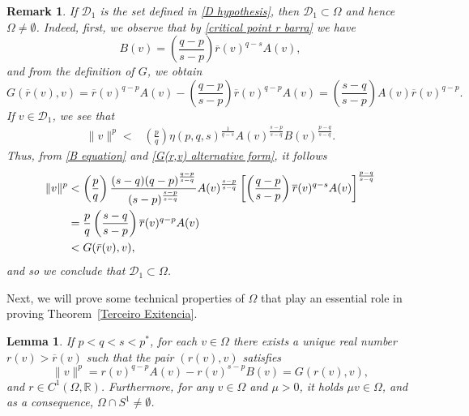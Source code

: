 \documentclass[12pt,reqno]{amsart}
\newtheorem{lemma}[theorem]{Lemma}
\newtheorem{remark}[theorem]{Remark}
\begin{document}
\begin{remark}\label{OmegaNaoVaZIO}
If $\mathcal{D}_1$ is the set defined in \eqref{D hypothesis}, then $\mathcal{D}_1\subset \Omega$ and hence $\Omega\neq\emptyset$. Indeed, first, we observe that by \eqref{critical point r barra} we have
	\begin{equation}\label{B equation}
		B(v)=\left(\frac{q-p}{s-p}\right)\overline{r}(v)^{q-s}A(v),
	\end{equation}
	and  from the definition of $G$, we obtain
	\begin{equation}\label{G(r,v) alternative form}
		G(\overline{r}(v),v)=\overline{r}(v)^{q-p}A(v)-\left(\frac{q-p}{s-p}\right)\overline{r}(v)^{q-p}A(v)= \left(\frac{s-q}{s-p}\right) A(v)\overline{r}(v)^{q-p}.
	\end{equation}	
	If $v \in \mathcal{D}_1$, we see that 
	\begin{align*}
		\|v\|^p<&\left(\frac{p}{q}\right)\eta(p,q,s)^{\frac{1}{q-s}}A(v)^{\frac{s-p}{s-q}}B(v)^{\frac{p-q}{s-q}}.
	\end{align*}
	Thus, from \eqref{B equation} and \eqref{G(r,v) alternative form}, it follows 
	\begin{align*}
		\|v\|^p&<\left(\frac{p}{q}\right)\frac{(s-q)(q-p)^{\frac{q-p}{s-q}}}{(s-p)^{\frac{s-p}{s-q}}}A(v)^{\frac{s-p}{s-q}}\left[\left(\frac{q-p}{s-p}\right)\overline{r}(v)^{q-s}A(v)\right]^{\frac{p-q}{s-q}}\\
		&=\frac{p}{q}\left(\frac{s-q}{s-p}\right)\overline{r}(v)^{q-p}A(v)\\
  &<G(\Bar{r}(v),v),
	\end{align*}
and so we conclude that $\mathcal{D}_1\subset \Omega$. 
\end{remark}



Next, we will prove some technical properties of $\Omega$ that play an essential role in proving Theorem~\ref{Terceiro Exitencia}.


\begin{lemma}\label{Propriedades Omega} If $p<q<s<p^*$, for each $v \in \Omega$ there exists a unique real number $r(v)>\overline{r}(v)$ such that the pair $(r(v),v)$ satisfies
$$
\|v\|^p=r(v)^{q-p}A(v)-r(v)^{s-p}B(v)=G(r(v),v),
$$
and $r\in C^1(\Omega, \mathds{R})$. Furthermore, for any $v\in \Omega$ and $\mu>0$, it holds $\mu v\in \Omega$, and as a consequence, $\Omega\cap S^1\neq\emptyset$.
\end{lemma}
\end{document}
